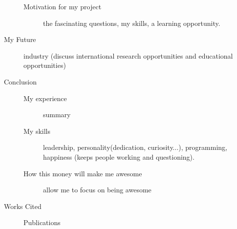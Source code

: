 \documentclass[11pt]{amsart}
\begin{document}
\begin{description}
		\begin{description}
			\item[Motivation for my project] the fascinating questions, my skills, a 				learning opportunity.
		\end{description}
	\item[My Future] industry (discuss international research opportunities and educational 	opportunities)
	\item[Conclusion] \hfill 
		\begin{description}
			\item[My experience] summary
			\item[My skills] leadership, personality(dedication, curiosity...), programming, 			happiness (keeps people working and questioning).
			\item[How this money will make me awesome] allow me to focus on being 			awesome
		\end{description}
	\item[Works Cited] \hfill 
		\begin{description}
			\item[Publications]
		\end{description}
\end{description}
\end{document}
